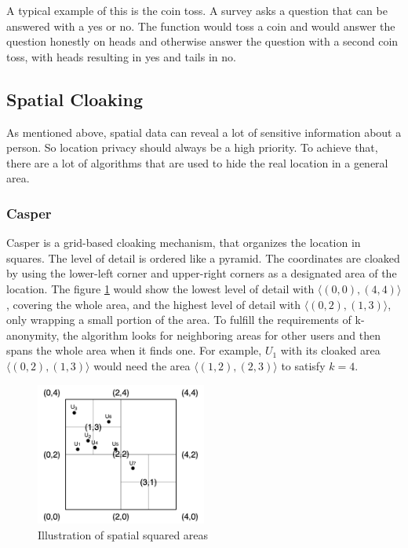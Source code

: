 A typical example of this is the coin toss. A survey asks a question that can be answered with a yes or no. The function would toss a coin and would answer the question honestly on heads and otherwise answer the question with a second coin toss, with heads resulting in yes and tails in no. 

\subsection{Spatial Cloaking}
As mentioned above, spatial data can reveal a lot of sensitive information about a person. So location privacy should always be a high priority. To achieve that, there are a lot of algorithms that are used to hide the real location in a general area.

\subsubsection{Casper}
Casper
is a grid-based cloaking mechanism, that organizes the location in squares. The level of detail is ordered like a pyramid. The coordinates are cloaked by using the lower-left corner and upper-right corners as a designated area of the location. The figure \ref{fig:casper} would show the lowest level of detail with \(\langle(0,0),(4,4)\rangle\), covering the whole area, and the highest level of detail with \(\langle(0,2),(1,3)\rangle\), only wrapping a small portion of the area. To fulfill the requirements of k-anonymity, the algorithm looks for neighboring areas for other users and then spans the whole area when it finds one. For example, \(U_1\) with its cloaked area \(\langle(0,2),(1,3)\rangle\) would need the area \(\langle(1,2),(2,3)\rangle\) to satisfy \(k=4\).

\begin{figure}[htpb]
  \centering
  \includegraphics[width=0.5\textwidth]{figures/casper.png}
  \caption{Illustration of spatial squared areas} \label{fig:casper}
\end{figure}

